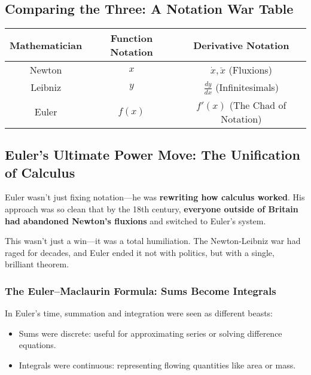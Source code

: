 \subsection{Comparing the Three: A Notation War Table}  

\begin{center}
\renewcommand{\arraystretch}{1.5}
\begin{tabular}{|c|c|c|}
\hline
\textbf{Mathematician} & \textbf{Function Notation} & \textbf{Derivative Notation} \\ \hline
Newton & $x$ & $\dot{x}, \ddot{x}$ (Fluxions) \\ \hline
Leibniz & $y$ & $\frac{dy}{dx}$ (Infinitesimals) \\ \hline
Euler & $f(x)$ & $f'(x)$ (The Chad of Notation) \\ \hline
\end{tabular}
\end{center}

\subsection{Euler’s Ultimate Power Move: The Unification of Calculus}  

Euler wasn’t just fixing notation—he was \textbf{rewriting how calculus worked}. His approach was so clean that by the 18th century, \textbf{everyone outside of Britain had abandoned Newton’s fluxions} and switched to Euler’s system.  

This wasn’t just a win—it was a total humiliation. The Newton-Leibniz war had raged for decades, and Euler ended it not with politics, but with a single, brilliant theorem.

\vspace{1em}
\subsubsection{The Euler–Maclaurin Formula: Sums Become Integrals}

In Euler’s time, summation and integration were seen as different beasts:

\begin{itemize}
  \item Sums were discrete: useful for approximating series or solving difference equations.
  \item Integrals were continuous: representing flowing quantities like area or mass.
\end{itemize}


